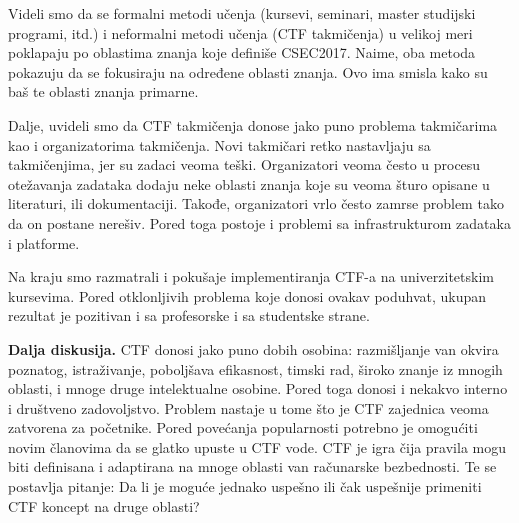 \documentclass[12pt, a4paper, twocolumn]{article}
\begin{document}
Videli smo da se formalni metodi učenja (kursevi, seminari, master 
studijski programi, itd.) i neformalni metodi učenja (CTF takmičenja) 
u velikoj meri poklapaju po oblastima znanja koje definiše CSEC2017. 
Naime, oba metoda pokazuju da se fokusiraju na određene oblasti 
znanja. Ovo ima smisla kako su baš te oblasti znanja primarne.

Dalje, uvideli smo da CTF takmičenja donose jako puno problema 
takmičarima kao i organizatorima takmičenja. Novi takmičari retko 
nastavljaju sa takmičenjima, jer su zadaci veoma teški. Organizatori 
veoma često u procesu otežavanja zadataka dodaju neke oblasti znanja 
koje su veoma šturo opisane u literaturi, ili dokumentaciji. Takođe, 
organizatori vrlo često zamrse problem tako da on postane nerešiv. 
Pored toga postoje i problemi sa infrastrukturom zadataka i platforme.

Na kraju smo razmatrali i pokušaje implementiranja CTF-a na 
univerzitetskim kursevima. Pored otklonljivih problema koje donosi 
ovakav poduhvat, ukupan rezultat je pozitivan i sa profesorske i sa 
studentske strane. 

\textbf{Dalja diskusija.} CTF donosi jako puno dobih osobina: razmišljanje 
van okvira poznatog, istraživanje, poboljšava efikasnost, timski rad, široko 
znanje iz mnogih oblasti, i mnoge druge intelektualne osobine. Pored toga 
donosi i nekakvo interno i društveno zadovoljstvo. Problem nastaje u tome što 
je CTF zajednica veoma zatvorena za početnike. Pored povećanja popularnosti 
potrebno je omogućiti novim članovima da se glatko upuste u CTF vode. CTF je 
igra čija pravila mogu biti definisana i adaptirana na mnoge oblasti van 
računarske bezbednosti. Te se postavlja pitanje: Da li je moguće jednako 
uspešno ili čak uspešnije primeniti CTF koncept na druge oblasti?

\nocite{*}

\printbibliography
\end{document}
